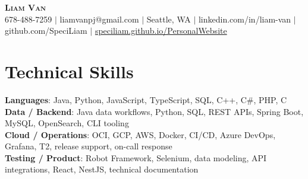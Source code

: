 \documentclass[letterpaper,11pt]{article}
\begin{document}

%
\begin{center}
    \textbf{\Huge \scshape Liam Van} \\ \vspace{1pt}
    \small 678-488-7259 $|$ \small {liamvanpj@gmail.com} $|$ Seattle, WA
 {{$|$ linkedin.com/in/liam-van} {$|$ github.com/SpeciLiam} {$|$ \href{https://speciliam.github.io/PersonalWebsite}{speciliam.github.io/PersonalWebsite}}}

\end{center}

\section{Technical Skills}
 \begin{itemize}[leftmargin=0.15in, label={}]
    \small{\item{
     \textbf{Languages}{: Java, Python, JavaScript, TypeScript, SQL, C++, C\#, PHP, C} \\
     \textbf{Data / Backend}{: Java data workflows, Python, SQL, REST APIs, Spring Boot, MySQL, OpenSearch, CLI tooling} \\
     \textbf{Cloud / Operations}{: OCI, GCP, AWS, Docker, CI/CD, Azure DevOps, Grafana, T2, release support, on-call response} \\
     \textbf{Testing / Product}{: Robot Framework, Selenium, data modeling, API integrations, React, NestJS, technical documentation} \\
    }}
 \end{itemize}
%
\end{document}
